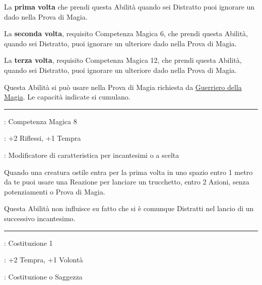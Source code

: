 \begin{multicols}{2}
La \textbf{prima volta} che prendi questa Abilità quando sei Distratto puoi ignorare un dado nella Prova di Magia.

La \textbf{seconda volta}, requisito Competenza Magica 6, che prendi questa Abilità, quando sei Distratto, puoi ignorare un ulteriore dado nella Prova di Magia.

La \textbf{terza volta}, requisito Competenza Magica 12, che prendi questa Abilità, quando sei Distratto, puoi ignorare un ulteriore dado nella Prova di Magia.

Questa Abilità si può usare nella Prova di Magia richiesta da \hyperlink{guerrierodellamagia}{Guerriero della Magia}. Le capacità indicate si cumulano.

\smallskip\noindent\rule{\linewidth}{2pt} \hypertarget{Incantatore Prudente}{}\medskip{}
\noindent
\begin{description}[noitemsep, topsep=0pt, parsep=0pt, partopsep=0pt, leftmargin=0cm, labelwidth=2.5cm]
    \item[\textbf{Requisito}]: Competenza Magica 8
    \item[\textbf{Tiri Salvezza}]: +2 Riflessi, +1 Tempra
    \item[\textbf{Caratteristica}]: Modificatore di caratteristica per incantesimi o a scelta
\end{description}

Quando una creatura ostile entra per la prima volta in uno spazio entro 1 metro da te puoi usare una Reazione per lanciare un trucchetto, entro 2 Azioni, senza potenziamenti o Prova di Magia.

Questa Abilità non influisce su fatto che si è comunque Distratti nel lancio di un successivo incantesimo.

\smallskip\noindent\rule{\linewidth}{2pt} \hypertarget{Immunita' ai veleni}{}\medskip{}
\noindent
\begin{description}[noitemsep, topsep=0pt, parsep=0pt, partopsep=0pt, leftmargin=0cm, labelwidth=2.5cm]
    \item[\textbf{Requisito}]: Costituzione 1
    \item[\textbf{Tiri Salvezza}]: +2 Tempra, +1 Volontà
    \item[\textbf{Caratteristica}]: Costituzione o Saggezza
\end{description}


\end{multicols}
